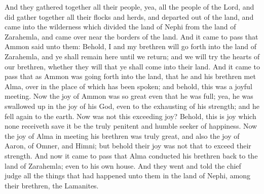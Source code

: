 And they gathered together all their people, yea, all the people of the Lord, and did gather together all their flocks and herds, and departed out of the land, and came into the wilderness which divided the land of Nephi from the land of Zarahemla, and came over near the borders of the land.
\bverse \iffalse And it came to pass that Ammon said unto them: Behold, I and my brethren will go forth into the land of Zarahemla, and ye shall remain here until we return; and we will try the hearts of our brethren, whether they will that ye shall come into their land. \fi
And it came to pass that Ammon said unto them: Behold, I and my brethren will go forth into the land of Zarahemla, and ye shall remain here until we return; and we will try the hearts of our brethren, whether they will that ye shall come into their land.
\bverse \iffalse And it came to pass that as Ammon was going forth into the land, that he and his brethren met Alma, over in the place of which has been spoken; and behold, this was a joyful meeting. \fi
And it came to pass that as Ammon was going forth into the land, that he and his brethren met Alma, over in the place of which has been spoken; and behold, this was a joyful meeting.
\bverse \iffalse Now the joy of Ammon was so great even that he was full; yea, he was swallowed up in the joy of his God, even to the exhausting of his strength; and he fell again to the earth. \fi
Now the joy of Ammon was so great even that he was full; yea, he was swallowed up in the joy of his God, even to the exhausting of his strength; and he fell again to the earth.
\bverse \iffalse Now was not this exceeding joy? Behold, this is joy which none receiveth save it be the truly penitent and humble seeker of happiness. \fi
Now was not this exceeding joy? Behold, this is joy which none receiveth save it be the truly penitent and humble seeker of happiness.
\bverse \iffalse Now the joy of Alma in meeting his brethren was truly great, and also the joy of Aaron, of Omner, and Himni; but behold their joy was not that to exceed their strength. \fi
Now the joy of Alma in meeting his brethren was truly great, and also the joy of Aaron, of Omner, and Himni; but behold their joy was not that to exceed their strength.
\bverse \iffalse And now it came to pass that Alma conducted his brethren back to the land of Zarahemla; even to his own house. And they went and told the chief judge all the things that had happened unto them in the land of Nephi, among their brethren, the Lamanites. \fi
And now it came to pass that Alma conducted his brethren back to the land of Zarahemla; even to his own house. And they went and told the chief judge all the things that had happened unto them in the land of Nephi, among their brethren, the Lamanites.

